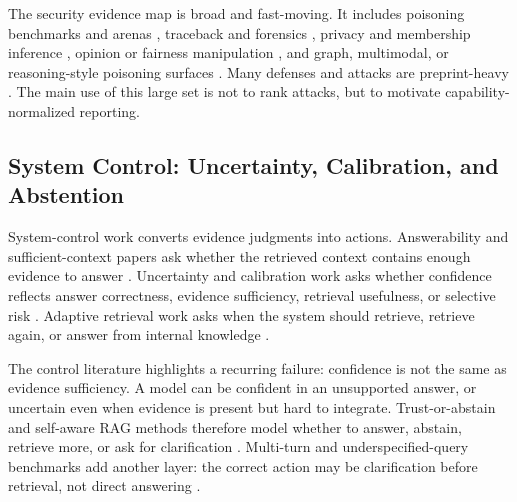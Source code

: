 The security evidence map is broad and fast-moving. It includes poisoning benchmarks and arenas \citep{rrag019,rrag023,rrag033,rrag035}, traceback and forensics \citep{rrag014,rrag128}, privacy and membership inference \citep{rrag060,rrag063,rrag096,rrag103}, opinion or fairness manipulation \citep{rrag104,rrag162}, and graph, multimodal, or reasoning-style poisoning surfaces \citep{rrag051,rrag127,rrag175}. Many defenses and attacks are preprint-heavy \citep{rrag022,rrag025,rrag026,rrag047,rrag050,rrag052,rrag053,rrag054,rrag056,rrag059,rrag061,rrag062,rrag068,rrag070,rrag072,rrag078,rrag079,rrag080,rrag083,rrag084,rrag085,rrag090,rrag094,rrag097,rrag098,rrag099,rrag101,rrag102,rrag106,rrag107,rrag109,rrag114,rrag116,rrag117,rrag119,rrag120,rrag121,rrag122,rrag123,rrag124,rrag125,rrag126,rrag129,rrag133,rrag134,rrag137,rrag138,rrag139,rrag142,rrag144,rrag145,rrag148,rrag149,rrag155,rrag156,rrag157,rrag158,rrag160,rrag161,rrag165,rrag171,rrag172,rrag177,rrag185,rrag188,rrag189,rrag190,rrag194,rrag195,rrag196,rrag197,rrag199,rrag203,rrag208,rrag211,rrag213,rrag217,rrag221,rrag229}. The main use of this large set is not to rank attacks, but to motivate capability-normalized reporting.

\subsection{System Control: Uncertainty, Calibration, and Abstention}

System-control work converts evidence judgments into actions. Answerability and sufficient-context papers ask whether the retrieved context contains enough evidence to answer \citep{sufficientContext2024,rrag111,rrag141,rrag193}. Uncertainty and calibration work asks whether confidence reflects answer correctness, evidence sufficiency, retrieval usefulness, or selective risk \citep{calibRAG2025,uncertaintyRAG2024,rrag001,rrag007,rrag012,rrag093}. Adaptive retrieval work asks when the system should retrieve, retrieve again, or answer from internal knowledge \citep{selfRAG2023,whenToRetrieve2024,crag2024,ctrla2025,rrag034}.

The control literature highlights a recurring failure: confidence is not the same as evidence sufficiency. A model can be confident in an unsupported answer, or uncertain even when evidence is present but hard to integrate. Trust-or-abstain and self-aware RAG methods therefore model whether to answer, abstain, retrieve more, or ask for clarification \citep{rrag002,rrag006,rrag041,rrag064,rrag066,rrag074,rrag075,rrag087,rrag095,rrag105,rrag108}. Multi-turn and underspecified-query benchmarks add another layer: the correct action may be clarification before retrieval, not direct answering \citep{rrag141,rrag146,rrag153}.

